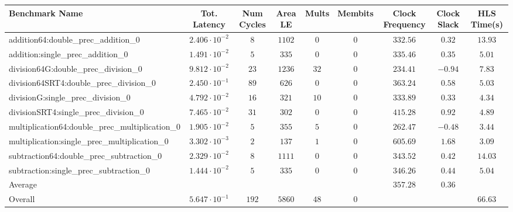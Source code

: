 \begin{tabular}{|l|c|c|c|c|c|c|c|c|}
\hline
Benchmark Name                                   & Tot. Latency            & Num Cycles & Area LE  & Mults  & Membits & Clock Frequency & Clock Slack & HLS Time(s) \\
\hline
addition64:double\_prec\_addition\_0             & $ 2.406 \cdot 10^{-2} $ & $ 8      $ & $ 1102 $ & $ 0  $ & $ 0   $ & $ 332.56      $ & $ 0.32    $ & $ 13.93   $ \\
addition:single\_prec\_addition\_0               & $ 1.491 \cdot 10^{-2} $ & $ 5      $ & $ 335  $ & $ 0  $ & $ 0   $ & $ 335.46      $ & $ 0.35    $ & $ 5.01    $ \\
division64G:double\_prec\_division\_0            & $ 9.812 \cdot 10^{-2} $ & $ 23     $ & $ 1236 $ & $ 32 $ & $ 0   $ & $ 234.41      $ & $ -0.94   $ & $ 7.83    $ \\
division64SRT4:double\_prec\_division\_0         & $ 2.450 \cdot 10^{-1} $ & $ 89     $ & $ 626  $ & $ 0  $ & $ 0   $ & $ 363.24      $ & $ 0.58    $ & $ 5.03    $ \\
divisionG:single\_prec\_division\_0              & $ 4.792 \cdot 10^{-2} $ & $ 16     $ & $ 321  $ & $ 10 $ & $ 0   $ & $ 333.89      $ & $ 0.33    $ & $ 4.34    $ \\
divisionSRT4:single\_prec\_division\_0           & $ 7.465 \cdot 10^{-2} $ & $ 31     $ & $ 302  $ & $ 0  $ & $ 0   $ & $ 415.28      $ & $ 0.92    $ & $ 4.89    $ \\
multiplication64:double\_prec\_multiplication\_0 & $ 1.905 \cdot 10^{-2} $ & $ 5      $ & $ 355  $ & $ 5  $ & $ 0   $ & $ 262.47      $ & $ -0.48   $ & $ 3.44    $ \\
multiplication:single\_prec\_multiplication\_0   & $ 3.302 \cdot 10^{-3} $ & $ 2      $ & $ 137  $ & $ 1  $ & $ 0   $ & $ 605.69      $ & $ 1.68    $ & $ 3.09    $ \\
subtraction64:double\_prec\_subtraction\_0       & $ 2.329 \cdot 10^{-2} $ & $ 8      $ & $ 1111 $ & $ 0  $ & $ 0   $ & $ 343.52      $ & $ 0.42    $ & $ 14.03   $ \\
subtraction:single\_prec\_subtraction\_0         & $ 1.444 \cdot 10^{-2} $ & $ 5      $ & $ 335  $ & $ 0  $ & $ 0   $ & $ 346.26      $ & $ 0.44    $ & $ 5.04    $ \\
\hline
Average                                          & $                     $ & $        $ & $      $ & $    $ & $     $ & $ 357.28      $ & $ 0.36    $ & $         $ \\
\hline
Overall                                          & $ 5.647 \cdot 10^{-1} $ & $ 192    $ & $ 5860 $ & $ 48 $ & $ 0   $ & $             $ & $         $ & $ 66.63   $ \\
\hline
\end{tabular}
